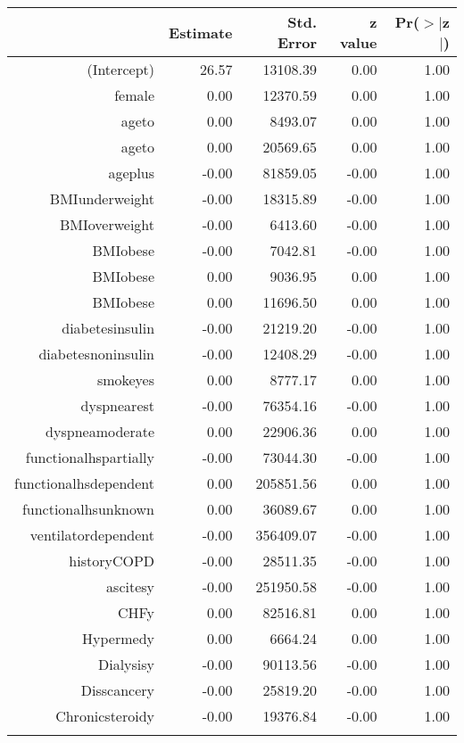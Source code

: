 \begin{tabular}{rrrrr}
  \hline
 & Estimate & Std. Error & z value & Pr($>$$|$z$|$) \\ 
  \hline
(Intercept) & 26.57 & 13108.39 & 0.00 & 1.00 \\ 
  female & 0.00 & 12370.59 & 0.00 & 1.00 \\ 
  age\-65\-to\-74 & 0.00 & 8493.07 & 0.00 & 1.00 \\ 
  age\-75\-to\-84 & 0.00 & 20569.65 & 0.00 & 1.00 \\ 
  age\-85\-plus & -0.00 & 81859.05 & -0.00 & 1.00 \\ 
  BMI\-underweight & -0.00 & 18315.89 & -0.00 & 1.00 \\ 
  BMI\-overweight & -0.00 & 6413.60 & -0.00 & 1.00 \\ 
  BMI\-obese\-1 & -0.00 & 7042.81 & -0.00 & 1.00 \\ 
  BMI\-obese\-2 & 0.00 & 9036.95 & 0.00 & 1.00 \\ 
  BMI\-obese\-3 & 0.00 & 11696.50 & 0.00 & 1.00 \\ 
  diabetes\-insulin & -0.00 & 21219.20 & -0.00 & 1.00 \\ 
  diabetes\-noninsulin & -0.00 & 12408.29 & -0.00 & 1.00 \\ 
  smoke\-yes & 0.00 & 8777.17 & 0.00 & 1.00 \\ 
  dyspnea\-rest & -0.00 & 76354.16 & -0.00 & 1.00 \\ 
  dyspnea\-moderate & 0.00 & 22906.36 & 0.00 & 1.00 \\ 
  functional\-hs\-partially & -0.00 & 73044.30 & -0.00 & 1.00 \\ 
  functional\-hs\-dependent & 0.00 & 205851.56 & 0.00 & 1.00 \\ 
  functional\-hs\-unknown & 0.00 & 36089.67 & 0.00 & 1.00 \\ 
  ventilator\-dependent & -0.00 & 356409.07 & -0.00 & 1.00 \\ 
  history\-COPD & -0.00 & 28511.35 & -0.00 & 1.00 \\ 
  ascites\-y & -0.00 & 251950.58 & -0.00 & 1.00 \\ 
  CHF\-y & 0.00 & 82516.81 & 0.00 & 1.00 \\ 
  Hyper\-med\-y & 0.00 & 6664.24 & 0.00 & 1.00 \\ 
  Dialysis\-y & -0.00 & 90113.56 & -0.00 & 1.00 \\ 
  Diss\-cancer\-y & -0.00 & 25819.20 & -0.00 & 1.00 \\ 
  Chronic\-steroid\-y & -0.00 & 19376.84 & -0.00 & 1.00 \\ 
$$
\end{tabular}
